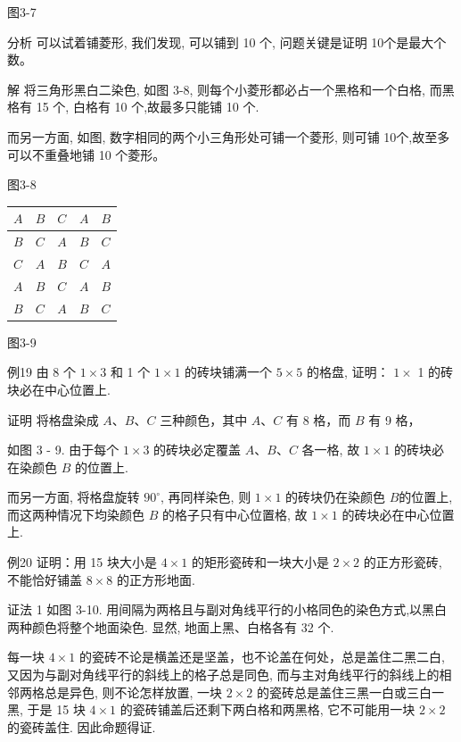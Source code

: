 \documentclass[10pt]{article}
\begin{document}
图3-7

分析 可以试着铺菱形, 我们发现, 可以铺到 10 个, 问题关键是证明 10个是最大个数。

解 将三角形黑白二染色, 如图 3-8, 则每个小菱形都必占一个黑格和一个白格, 而黑格有 15 个, 白格有 10 个,故最多只能铺 10 个.

而另一方面, 如图, 数字相同的两个小三角形处可铺一个菱形, 则可铺 10个,故至多可以不重叠地铺 10 个菱形。

图3-8

\begin{center}
\begin{tabular}{|l|l|l|l|l|}
\hline
$A$ & $B$ & $C$ & $A$ & $B$ \\
\hline
$B$ & $C$ & $A$ & $B$ & $C$ \\
\hline
$C$ & $A$ & $B$ & $C$ & $A$ \\
\hline
$A$ & $B$ & $C$ & $A$ & $B$ \\
\hline
$B$ & $C$ & $A$ & $B$ & $C$ \\
\hline
\end{tabular}
\end{center}

图3-9

例19 由 8 个 $1 \times 3$ 和 1 个 $1 \times 1$ 的砖块铺满一个 $5 \times 5$ 的格盘, 证明： $1 \times$ 1 的砖块必在中心位置上.

证明 将格盘染成 $A 、 B 、 C$ 三种颜色，其中 $A 、 C$ 有 8 格，而 $B$ 有 9 格，

如图 3 - 9. 由于每个 $1 \times 3$ 的砖块必定覆盖 $A 、 B 、 C$ 各一格, 故 $1 \times 1$ 的砖块必在染颜色 $B$ 的位置上.

而另一方面, 将格盘旋转 $90^{\circ}$, 再同样染色, 则 $1 \times 1$ 的砖块仍在染颜色 $B$的位置上, 而这两种情况下均染颜色 $B$ 的格子只有中心位置格, 故 $1 \times 1$ 的砖块必在中心位置上.

例20 证明：用 15 块大小是 $4 \times 1$ 的矩形瓷砖和一块大小是 $2 \times 2$ 的正方形瓷砖, 不能恰好铺盖 $8 \times 8$ 的正方形地面.

证法 1 如图 3-10. 用间隔为两格且与副对角线平行的小格同色的染色方式,以黑白两种颜色将整个地面染色. 显然, 地面上黑、白格各有 32 个.

每一块 $4 \times 1$ 的瓷砖不论是横盖还是坚盖，也不论盖在何处，总是盖住二黑二白, 又因为与副对角线平行的斜线上的格子总是同色, 而与主对角线平行的斜线上的相邻两格总是异色, 则不论怎样放置, 一块 $2 \times 2$ 的瓷砖总是盖住三黑一白或三白一黑, 于是 15 块 $4 \times 1$ 的瓷砖铺盖后还剩下两白格和两黑格, 它不可能用一块 $2 \times 2$ 的瓷砖盖住. 因此命题得证.
\end{document}
